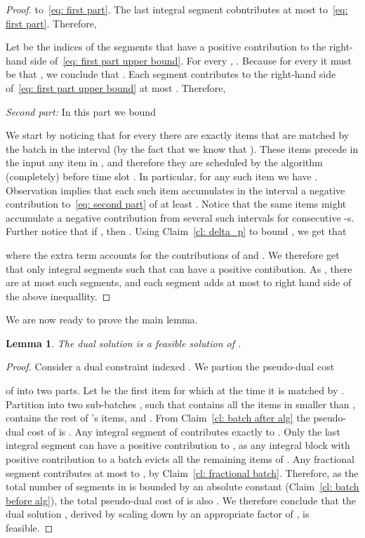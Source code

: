 \documentclass[12pt]{article}
\newtheorem{lemma}[theorem]{Lemma}
\begin{document}
\begin{proof}
to~\eqref{eq: first part}.
The last integral segment  cobntributes at most 
to~\eqref{eq: first part}. Therefore,

Let  be the indices of the segments
that have a positive contribution to the right-hand side of~\eqref{eq: first part upper bound}.
For every , 
.
Because for every  it must be that , 
we conclude that . Each segment  contributes
to the right-hand side of~\eqref{eq: first part upper bound} at most .
Therefore,


{\em Second part:}\/ In this part we bound

We start by noticing that for every 
there are exactly  items that are matched by the
batch  in the interval  (by the fact that 
we know that ). These items precede
in the input any item in , and therefore they are
scheduled by the algorithm (completely) before time slot .
In particular, for any such item  we have .
Observation  implies that each such item accumulates
in the interval  a negative contribution to~\eqref{eq: second part}
of at least . Notice that the same items might
accumulate a negative contribution from several such intervals
for consecutive -s. Further notice that if , then
.
Using Claim~\ref{cl: delta_p} to bound , we get that

where the extra term  accounts for the contributions of  and .
We therefore get that only integral segments  such that
 can have 
a positive contibution. As ,
there are at most  such segments, and each
segment adds at most  to right hand side of the above
inequallity.
\end{proof}

We are now ready to prove the main lemma.
\begin{lemma}\label{lm: (y,z) feasible}
The dual solution  is a feasible solution of .
\end{lemma}

\begin{proof}
Consider a dual constraint indexed . 
We partion the pseudo-dual cost 

of 
into two parts. Let  be the first item for which  at the
time it is matched by . Partition  into two 
sub-batches ,  
such that  contains 
all the items in  smaller than ,  contains 
the rest of 's items, and .
From Claim~\ref{cl: batch after alg} the pseudo-dual cost of 
 is . Any integral segment 
of  contributes 
exactly  to . Only 
the last integral segment can have a positive contribution 
to , as any integral block with positive 
contribution to a batch  evicts all the remaining 
items of . Any fractional segment contributes at most 
 to , by 
Claim~\ref{cl: fractional batch}. Therefore, as the total
number of segments in  is bounded by an
absolute constant
(Claim~\ref{cl: batch before alg}), the total pseudo-dual 
cost of  is also .
We therefore conclude that the dual solution ,
derived by scaling down  
by an appropriate factor of , is feasible.
\end{proof}
\end{document}
